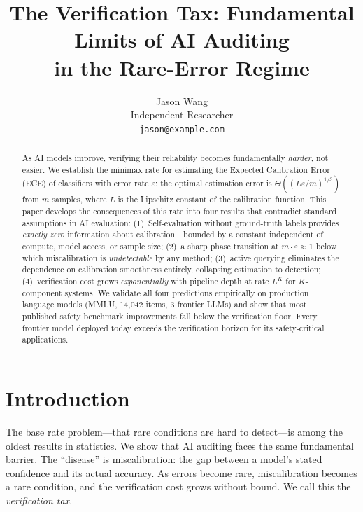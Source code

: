 \documentclass{article}
\title{The Verification Tax: Fundamental Limits of AI Auditing \\ in the Rare-Error Regime}
\author{
Jason Wang \\
Independent Researcher \\
\texttt{jason@example.com}
}
\newcommand{\Lip}{L}
\newcommand{\errrate}{\varepsilon}
\newcommand{\nsamples}{m}
\theoremstyle{definition}
\begin{document}
\maketitle

\begin{abstract}
As AI models improve, verifying their reliability becomes fundamentally \emph{harder}, not easier. We establish the minimax rate for estimating the Expected Calibration Error (ECE) of classifiers with error rate $\errrate$: the optimal estimation error is $\Theta((\Lip\errrate/\nsamples)^{1/3})$ from $\nsamples$ samples, where $\Lip$ is the Lipschitz constant of the calibration function. This paper develops the consequences of this rate into four results that contradict standard assumptions in AI evaluation:
(1)~Self-evaluation without ground-truth labels provides \emph{exactly zero} information about calibration---bounded by a constant independent of compute, model access, or sample size;
(2)~a sharp phase transition at $\nsamples \cdot \errrate \approx 1$ below which miscalibration is \emph{undetectable} by any method;
(3)~active querying eliminates the dependence on calibration smoothness entirely, collapsing estimation to detection;
(4)~verification cost grows \emph{exponentially} with pipeline depth at rate $\Lip^K$ for $K$-component systems.
We validate all four predictions empirically on production language models (MMLU, 14{,}042 items, 3 frontier LLMs) and show that most published safety benchmark improvements fall below the verification floor. Every frontier model deployed today exceeds the verification horizon for its safety-critical applications.
\end{abstract}

\section{Introduction}
\label{sec:intro}

The base rate problem---that rare conditions are hard to detect---is among the oldest results in statistics. We show that AI auditing faces the same fundamental barrier. The ``disease'' is miscalibration: the gap between a model's stated confidence and its actual accuracy. As errors become rare, miscalibration becomes a rare condition, and the verification cost grows without bound. We call this the \emph{verification tax}.
\end{document}
